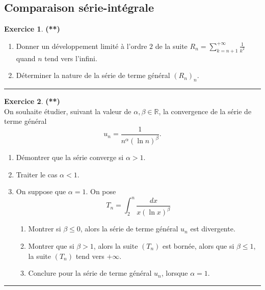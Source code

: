 \documentclass[a4paper,11pt]{article}
\theoremstyle{definition}
\newtheorem{exo}{Exercice} %
\newcommand{\disp}{\displaystyle}
\begin{document}
\begin{minipage}{1\linewidth}\begin{minipage}[t]{0.48\linewidth}\raggedright
		\subsection*{Comparaison série-intégrale}
		\begin{exo}\textbf{(**)}\quad\\[0.2cm]
			\begin{enumerate}
				\item Donner un développement limité à l'ordre $2$ de la suite $\disp R_n = \sum_{k=n+1}^{+\infty}\frac{1}{k^2}$ quand $n$ tend vers l'infini.
				\item Déterminer la nature de la série de terme général $(R_n)_n$. 
			\end{enumerate}
			
			
			\centering\rule{1\linewidth}{0.6pt}\end{exo}
		
		
		
		\begin{exo}\textbf{(**)}\quad{}\\[0.2cm]
			On souhaite étudier, suivant la valeur de $\alpha,\beta\in\mathbb R$, la convergence de la série de terme général
			$$u_n=\frac{1}{n^\alpha(\ln n)^\beta}.$$
			\begin{enumerate}
				\item Démontrer que la série converge si $\alpha>1$.
				\item Traiter le cas $\alpha<1$.
				\item On suppose que $\alpha=1$. 
				On pose $$\disp T_n=\int_2^n \frac{dx}{x(\ln x)^\beta}$$
				\begin{enumerate}
					\item Montrer si $\beta\leq 0$, alors la série de terme général $u_n$ est divergente.
					\item Montrer que si $\beta>1$, alors la suite $(T_n)$ est bornée, alors que si $\beta\leq 1$, la suite $(T_n)$ tend vers $+\infty$.
					\item Conclure pour la série de terme général $u_n$, lorsque $\alpha=1$.
				\end{enumerate}
			\end{enumerate}
			
			\centering\rule{1\linewidth}{0.6pt}\end{exo}
		
		
		

\end{minipage}
\end{minipage}
\end{document}
